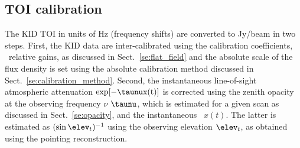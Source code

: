 %
%
%
%
  
\subsection{TOI calibration}
\label{se:flux_calib}
The KID TOI in units of Hz (frequency shifts) are converted to
Jy/beam in two steps. First, the KID data are inter-calibrated using the
calibration coefficients, \aka\ relative gains, 
as discussed in Sect.~\ref{se:flat_field} and the
absolute scale of the flux density is set using the absolute
calibration method discussed in
Sect.~\ref{se:calibration_method}. Second, the instantaneous line-of-sight
atmospheric attenuation $\rm{exp}[{-\taunu x(t)}]$ is corrected
using the zenith opacity at the observing frequency $\nu$ $\taunu$, which is estimated for a given scan
as discussed in Sect.~\ref{se:opacity}, and the instantaneous \airmass\
$x(t)$. {\lp The latter is estimated as $(\sin \elev_t)^{-1}$ using the observing elevation
$\elev_t$, as obtained using the pointing reconstruction.}     

